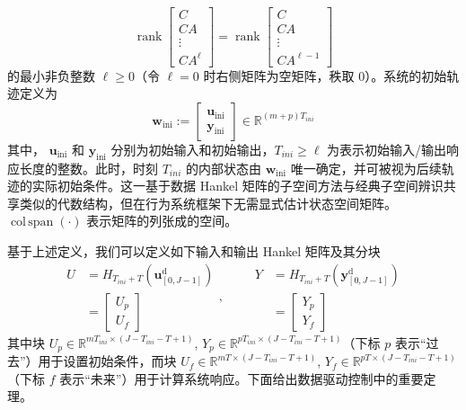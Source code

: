 \begin{equation}
	\operatorname{rank} \begin{bmatrix}
		C \\ CA \\ \vdots \\ CA^{\ell}
	\end{bmatrix}
	= \operatorname{rank} \begin{bmatrix}
		C \\ CA \\ \vdots \\ CA^{\ell-1}
	\end{bmatrix}
	\label{eq:lag_rank}
\end{equation}
的最小非负整数 $\ell \geq 0$（令 $\ell = 0$ 时右侧矩阵为空矩阵，秩取 $0$）。系统的初始轨迹定义为
\begin{equation}
	\mathbf{w}_{\mathrm{ini}} := \begin{bmatrix} \mathbf{u}_{\mathrm{ini}} \\ \mathbf{y}_{\mathrm{ini}} \end{bmatrix} \in \mathbb{R}^{(m+p)T_{ini}}
	\label{eq:initial_trajectory}
\end{equation}
其中， \( \mathbf{u}_{\mathrm{ini}} \) 和 \( \mathbf{y}_{\mathrm{ini}} \) 分别为初始输入和初始输出，\( T_{ini} \geq \ell \) 为表示初始输入/输出响应长度的整数。此时，时刻 $T_{ini}$ 的内部状态由 $\mathbf{w}_{\mathrm{ini}}$ 唯一确定，并可被视为后续轨迹的实际初始条件。这一基于数据 Hankel 矩阵的子空间方法与经典子空间辨识共享类似的代数结构，但在行为系统框架下无需显式估计状态空间矩阵。\(\operatorname{col\,span}(\cdot)\) 表示矩阵的列张成的空间。

基于上述定义，我们可以定义如下输入和输出 Hankel 矩阵及其分块
\begin{equation}
	\begin{aligned}
		U &= H_{T_{ini}+T}(\mathbf{u}^{\mathrm{d}}_{[0,J-1]}) \\
		&= \begin{bmatrix} U_p \\ U_f \end{bmatrix}
	\end{aligned},
	\qquad
	\begin{aligned}
		Y &= H_{T_{ini}+T}(\mathbf{y}^{\mathrm{d}}_{[0,J-1]}) \\
		&= \begin{bmatrix} Y_p \\ Y_f \end{bmatrix}
	\end{aligned}
	\label{eq:hankel_partition}
\end{equation}
其中块 \( U_p \in \mathbb{R}^{mT_{ini} \times (J - T_{ini} - T + 1)} \), \( Y_p \in \mathbb{R}^{pT_{ini} \times (J - T_{ini} - T + 1)} \)（下标 \( p \) 表示“过去”）用于设置初始条件，而块 \( U_f \in \mathbb{R}^{mT \times (J - T_{ini} - T + 1)} \), \( Y_f \in \mathbb{R}^{pT \times (J - T_{ini} - T + 1)} \)（下标 \( f \) 表示“未来”）用于计算系统响应。下面给出数据驱动控制中的重要定理。


